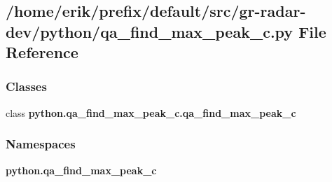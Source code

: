\subsection{/home/erik/prefix/default/src/gr-\/radar-\/dev/python/qa\+\_\+find\+\_\+max\+\_\+peak\+\_\+c.py File Reference}
\label{qa__find__max__peak__c_8py}
\subsubsection*{Classes}
\begin{DoxyCompactItemize}
\item 
class {\bf python.\+qa\+\_\+find\+\_\+max\+\_\+peak\+\_\+c.\+qa\+\_\+find\+\_\+max\+\_\+peak\+\_\+c}
\end{DoxyCompactItemize}
\subsubsection*{Namespaces}
\begin{DoxyCompactItemize}
\item 
 {\bf python.\+qa\+\_\+find\+\_\+max\+\_\+peak\+\_\+c}
\end{DoxyCompactItemize}
